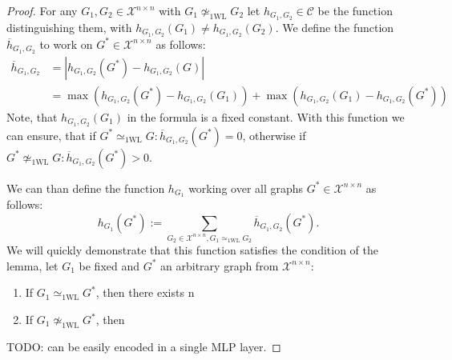 \documentclass[11pt, dvipsnames, DIV=12]{scrreprt}
\theoremstyle{definition}
\newcommand{\cC}{\mathcal{C}}
\newcommand{\wliso}{\simeq_{\text{1WL}}}
\newcommand{\xnn}{\mathcal{X}^{n \times n}}
\begin{document}
\begin{proof}
    For any $G_1, G_2 \in \xnn$ with $G_1 \not\wliso G_2$ let $h_{G_1, G_2} \in \cC$ be the function distinguishing them, with $h_{G_1, G_2}(G_1) \neq h_{G_1, G_2}(G_2)$. We define the function $\overline{h}_{G_1, G_2}$ to work on $G^* \in \xnn$ as follows:
    \begin{align*}
        \overline{h}_{G_1, G_2} &= |h_{G_1, G_2}(G^*) - h_{G_1, G_2}(G)| \nonumber\\
        &= \max(h_{G_1, G_2}(G^*) - h_{G_1, G_2}(G_1)) + \max(h_{G_1, G_2}(G_1) - h_{G_1, G_2}(G^*))
    \end{align*}
    Note, that $h_{G_1, G_2}(G_1)$ in the formula is a fixed constant. With this function we can ensure, that if $G^* \wliso G: \overline{h}_{G_1, G_2}(G^*) = 0$, otherwise if $G^* \not\wliso G: \overline{h}_{G_1, G_2}(G^*) > 0$.

    We can than define the function $h_{G_1}$ working over all graphs $G^* \in \xnn$ as follows:
    \begin{equation*}
        h_{G_1}(G^*) := \sum_{G_2 \in \xnn, G_1 \wliso G_2} \overline{h}_{G_1, G_2}(G^*).
    \end{equation*}
    We will quickly demonstrate that this function satisfies the condition of the lemma, let $G_1$ be fixed and $G^*$ an arbitrary graph from $\xnn$:
    \begin{enumerate}
        \item If $G_1 \wliso G^*$, then there exists n
        \item If $G_1 \not\wliso G^*$, then 
    \end{enumerate}
    TODO: can be easily encoded in a single MLP layer.
\end{proof}
\end{document}
